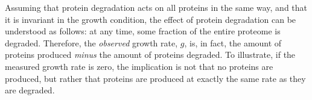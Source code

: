 Assuming that protein degradation acts on all proteins in the same way, and that it is invariant in the growth condition, the effect of protein degradation can be understood as follows: at any time, some fraction of the entire proteome is degraded.
Therefore, the \emph{observed} growth rate, $g$, is, in fact, the amount of proteins produced \emph{minus} the amount of proteins degraded.
To illustrate, if the measured growth rate is zero, the implication is not that no proteins are produced, but rather that proteins are produced at exactly the same rate as they are degraded.
